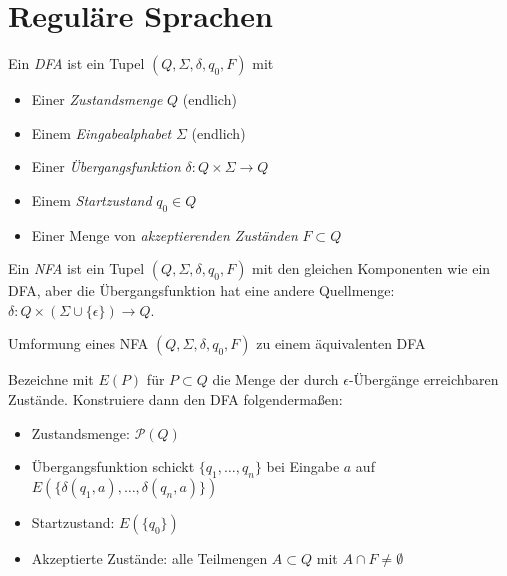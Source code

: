 \documentclass{cheat-sheet}
\begin{document}


\section{Reguläre Sprachen}

\begin{defn}
Ein \emph{DFA} ist ein Tupel $(Q, \Sigma, \delta, q_{0}, F)$ mit

\begin{itemize}{\leftmargin=0em}
  \setlength{\leftmargin}{0pt}
  \item Einer \emph{Zustandsmenge} $Q$ (endlich)
  \item Einem \emph{Eingabealphabet} $\Sigma$ (endlich)
  \item Einer \emph{Übergangsfunktion} $\delta : Q \times \Sigma \to Q$
  \item Einem \emph{Startzustand} $q_{0} \in Q$
  \item Einer Menge von \emph{akzeptierenden Zuständen} $F \subset Q$
\end{itemize}
\end{defn}

\begin{defn}
Ein \emph{NFA} ist ein Tupel $(Q, \Sigma, \delta, q_{0}, F)$ mit den gleichen Komponenten wie ein DFA, aber die Übergangsfunktion hat eine andere Quellmenge: $\delta : Q \times (\Sigma \cup \{ \epsilon \}) \to Q$.
\end{defn}

\begin{alg}
Umformung eines NFA $(Q, \Sigma, \delta, q_{0}, F)$ zu einem äquivalenten DFA
\end{alg}

Bezeichne mit $E(P)$ für $P \subset Q$ die Menge der durch $\epsilon$-Übergänge erreichbaren Zustände. Konstruiere dann den DFA folgendermaßen:

\begin{itemize}
  \item Zustandsmenge: $\mathcal{P}(Q)$
  \item Übergangsfunktion schickt $\{q_{1}, \ldots, q_{n}\}$ bei Eingabe $a$ auf $E(\{\delta(q_{1}, a), \ldots, \delta(q_{n}, a)\})$
  \item Startzustand: $E(\{q_{0}\})$
  \item Akzeptierte Zustände: alle Teilmengen $A \subset Q$ mit $A \cap F \neq \emptyset$
\end{itemize}
\end{document}
